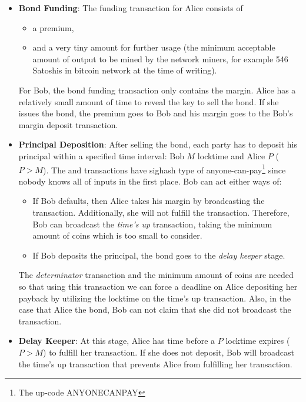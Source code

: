 \begin{itemize}
    \item \textbf{Bond Funding}: 
    The funding transaction for Alice consists of 
    \begin{itemize}
        \item a premium, 
        \item and a very tiny amount for further usage (the minimum acceptable amount of output to be mined by the network miners, for example 546 Satoshis in bitcoin network at the time of writing).
    \end{itemize}
    For Bob, the bond funding transaction only contains the margin. Alice has a relatively small amount of time to reveal the \Aone  key to sell the bond. If she issues the bond, the premium goes to Bob and his margin goes to the Bob's margin deposit transaction.
    
    \item \textbf{Principal Deposition}: 
    After selling the bond, each party has to deposit his principal within a specified time interval: Bob $M$ locktime and Alice $P$ ($P > M$). The  and   transactions have sighash type of anyone-can-pay\footnote{The up-code ANYONECANPAY} since nobody knows all of  inputs in the first place. Bob can act either ways of:
    \begin{itemize}
        \item If Bob defaults, then Alice takes his margin by broadcasting the  transaction. Additionally, she will not fulfill the  transaction. Therefore, Bob can broadcast the \emph{time's up} transaction, taking the minimum amount of coins which is too small to consider.
        \item If Bob deposits the principal, the bond goes to the \emph{delay keeper} stage.
    \end{itemize}
    The \emph{determinator} transaction and the minimum amount of coins are needed so that using this transaction we can force a deadline on Alice depositing her payback by utilizing the locktime on the time's up transaction. Also, in the case that Alice  the bond, Bob can not claim that she did not broadcast the  transaction.
    
    \item \textbf{Delay Keeper}: At this stage, Alice has time before a $P$ locktime expires ($P > M$) to fulfill her  transaction. If she does not deposit, Bob will broadcast the time's up transaction that prevents Alice from fulfilling her  transaction. 
    

\end{itemize}
